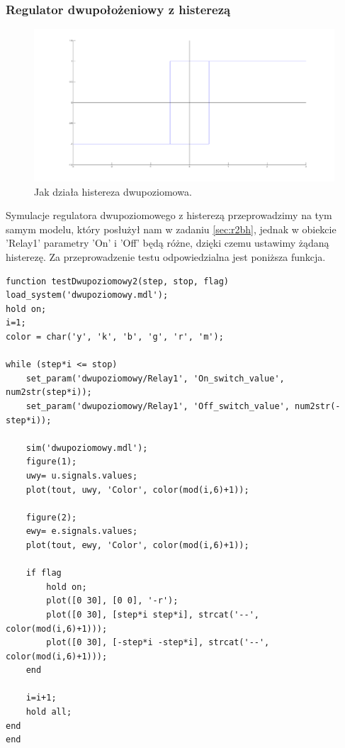 \documentclass[a4paper,10pt]{article}
\begin{document}
\subsubsection{Regulator dwupołożeniowy z histerezą}\label{sec:r2h}%


\begin{figure}[!h]
    \centering
	\includegraphics[width=120mm]{CW3-histereza-dwupoziomowa.png}
	\caption{Jak działa histereza dwupoziomowa.}
    \label{fig:Rysunek}
\end{figure}

Symulacje regulatora dwupoziomowego z histerezą przeprowadzimy na tym samym modelu, który posłużył nam w zadaniu \ref{sec:r2bh}, jednak w obiekcie 'Relay1' parametry 'On' i 'Off' będą różne, dzięki czemu ustawimy żądaną histerezę.\newpage
Za przeprowadzenie testu odpowiedzialna jest poniższa funkcja.

\begin{lstlisting}[caption=Funkcja testująca regulator dwupoziomowy z histerezą.]
function testDwupoziomowy2(step, stop, flag)
load_system('dwupoziomowy.mdl');
hold on;
i=1;
color = char('y', 'k', 'b', 'g', 'r', 'm');

while (step*i <= stop)
    set_param('dwupoziomowy/Relay1', 'On_switch_value', num2str(step*i));
    set_param('dwupoziomowy/Relay1', 'Off_switch_value', num2str(-step*i));

    sim('dwupoziomowy.mdl');
    figure(1);
    uwy= u.signals.values;    
    plot(tout, uwy, 'Color', color(mod(i,6)+1));

    figure(2);
    ewy= e.signals.values;    
    plot(tout, ewy, 'Color', color(mod(i,6)+1));

    if flag
        hold on;
        plot([0 30], [0 0], '-r');
        plot([0 30], [step*i step*i], strcat('--', color(mod(i,6)+1)));
        plot([0 30], [-step*i -step*i], strcat('--', color(mod(i,6)+1)));
    end

    i=i+1;
    hold all;
end
end
\end{lstlisting}
\end{document}
